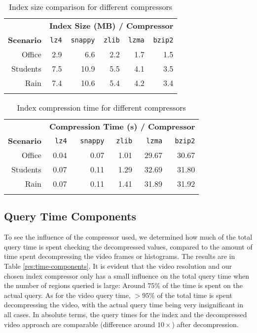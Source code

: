 \begin{table}
    \caption{Index size comparison for different compressors}\label{res:compressor-space}
	\centering
    \begin{tabular}{ r rrrrr }
		~ & \multicolumn{5}{c}{\textbf{Index Size (MB) / Compressor}}\\
		\cline{2-6}
	    \textbf{Scenario} & \texttt{lz4} & \texttt{snappy} & \texttt{zlib} & \texttt{lzma} & \texttt{bzip2} \\  \hline\noalign{\smallskip}
		Office   		& 2.9 &  6.6 & 2.2 & 1.7 & 1.5   \\
	    Students		& 7.5 & 10.9 & 5.5 & 4.1 & 3.5  \\
	    Rain     		& 7.4 & 10.6 & 5.4 & 4.2 & 3.4  \\\noalign{\smallskip}
        \hline
	   \end{tabular}
\end{table}

\begin{table}
    \caption{Index compression time for different compressors}\label{res:compressor-time}
	\centering
    \begin{tabular}{ r rrrrr }
		~ & \multicolumn{5}{c}{\textbf{Compression Time (s) / Compressor}}\\
		\cline{2-6}
	    \textbf{Scenario} & \texttt{lz4} & \texttt{snappy} & \texttt{zlib} & \texttt{lzma} & \texttt{bzip2} \\  \hline\noalign{\smallskip}
		Office   		& 0.04 & 0.07 & 1.01 & 29.67 & 30.67   \\
	    Students		& 0.07 & 0.11 & 1.29 & 32.69 & 31.80  \\
	    Rain     		& 0.07 & 0.11 & 1.41 & 31.89 & 31.92  \\\noalign{\smallskip} 
        \hline
	   \end{tabular}
\end{table}

\subsection*{Query Time Components}\label{sec:query-time-components}
To see the influence of the compressor used, we determined how much of the total query time is spent checking the decompressed values, compared to the amount of time spent decompressing the video frames or histograms. The results are in Table \ref{res:time-components}. It is evident that the video resolution and our chosen index compressor only has a small influence on the total query time when the number of regions queried is large: Around $75\%$ of the time is spent on the actual query. As for the video query time, $>95\%$ of the total time is spent decompressing the video, with the actual query time being very insignificant in all cases. In absolute terms, the query times for the index and the decompressed video approach are comparable (difference around $10\times$) after decompression.

